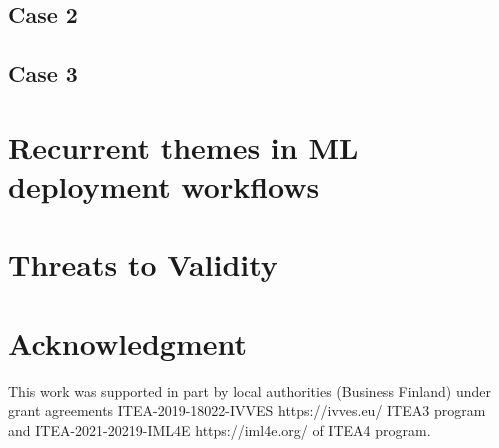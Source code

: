 \documentclass[manuscript,screen,review]{acmart}
\begin{document}
\subsection*{Case 2}\label{2}


\subsection*{Case 3}\label{3}









\section{Recurrent themes in ML deployment workflows} %
\label{sec: recurrent_themes}




\section{Threats to Validity}
\label{sec: validity}


\section*{Acknowledgment}

This work was supported in part by local authorities (Business Finland) under grant agreements ITEA-2019-18022-IVVES https://ivves.eu/ ITEA3 program and ITEA-2021-20219-IML4E https://iml4e.org/ of ITEA4 program.

% 



\end{document}
